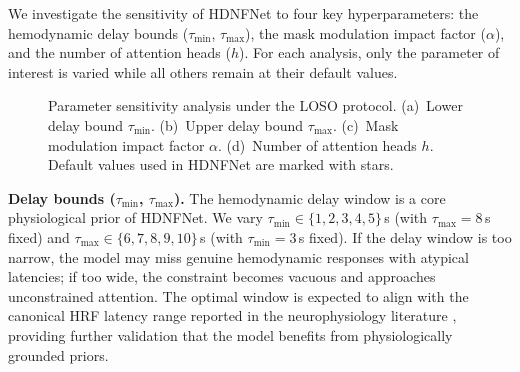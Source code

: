 \documentclass[preprint,12pt,authoryear]{elsarticle}
\begin{document}
We investigate the sensitivity of HDNFNet to four key hyperparameters: the hemodynamic delay bounds ($\tau_{\min}$, $\tau_{\max}$), the mask modulation impact factor ($\alpha$), and the number of attention heads ($h$). For each analysis, only the parameter of interest is varied while all others remain at their default values.

\begin{figure}[t]
\centering
\caption{Parameter sensitivity analysis under the LOSO protocol. (a)~Lower delay bound $\tau_{\min}$. (b)~Upper delay bound $\tau_{\max}$. (c)~Mask modulation impact factor $\alpha$. (d)~Number of attention heads $h$. Default values used in HDNFNet are marked with stars.}
\label{fig:sensitivity}
\end{figure}


\noindent\textbf{Delay bounds ($\tau_{\min}$, $\tau_{\max}$).} The hemodynamic delay window is a core physiological prior of HDNFNet. We vary $\tau_{\min} \in \{1, 2, 3, 4, 5\}$\,s (with $\tau_{\max} = 8$\,s fixed) and $\tau_{\max} \in \{6, 7, 8, 9, 10\}$\,s (with $\tau_{\min} = 3$\,s fixed). If the delay window is too narrow, the model may miss genuine hemodynamic responses with atypical latencies; if too wide, the constraint becomes vacuous and approaches unconstrained attention. The optimal window is expected to align with the canonical HRF latency range reported in the neurophysiology literature \citep{buxton1998dynamics, lindquist2009modeling}, providing further validation that the model benefits from physiologically grounded priors.
\end{document}
